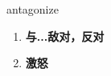 
\begin{frame}
{\huge antagonize}
\begin{center}
\begin{enumerate}\Large
  \item \textbf{与...敌对，反对}
  \item \textbf{激怒}
\end{enumerate}
\end{center}
\end{frame}
